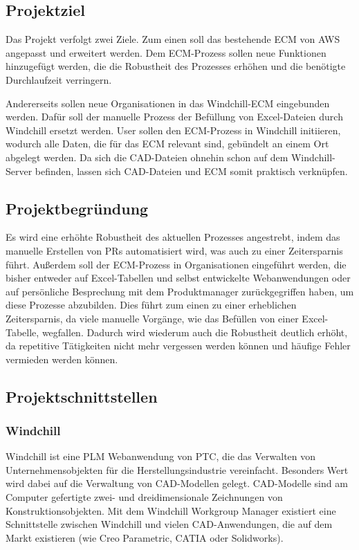 \subsection{Projektziel} 
\label{sec:Projektziel}
Das Projekt verfolgt zwei Ziele.
Zum einen soll das bestehende \ac{ECM} von \ac{AWS} angepasst und erweitert werden.
Dem \ac{ECM}-Prozess sollen neue Funktionen hinzugefügt werden, die die Robustheit des Prozesses erhöhen und die benötigte Durchlaufzeit verringern.

Andererseits sollen neue Organisationen in das Windchill-\ac{ECM} eingebunden werden.
Dafür soll der manuelle Prozess der Befüllung von Excel-Dateien durch Windchill ersetzt werden.
User sollen den \ac{ECM}-Prozess in Windchill initiieren, wodurch alle Daten, die für das \ac{ECM} relevant sind, gebündelt an einem Ort abgelegt werden.
Da sich die CAD-Dateien ohnehin schon auf dem Windchill-Server befinden, lassen sich CAD-Dateien und \ac{ECM} somit praktisch verknüpfen.

\subsection{Projektbegründung} 
\label{sec:Projektbegruendung}
Es wird eine erhöhte Robustheit des aktuellen Prozesses angestrebt, indem das manuelle Erstellen von \acp{PR} automatisiert wird, was auch zu einer Zeitersparnis führt.
Außerdem soll der \ac{ECM}-Prozess in Organisationen eingeführt werden, die bisher entweder auf Excel-Tabellen und selbst entwickelte Webanwendungen oder auf persönliche Besprechung mit dem Produktmanager zurückgegriffen haben, um diese Prozesse abzubilden.
Dies führt zum einen zu einer erheblichen Zeitersparnis, da viele manuelle Vorgänge, wie das Befüllen von einer Excel-Tabelle, wegfallen.
Dadurch wird wiederum auch die Robustheit deutlich erhöht, da repetitive Tätigkeiten nicht mehr vergessen werden können und häufige Fehler vermieden werden können.


\subsection{Projektschnittstellen}
\label{sec:Projektschnittstellen}

\subsubsection{Windchill}
Windchill ist eine \ac{PLM} Webanwendung von PTC, die das Verwalten von Unternehmensobjekten für die Herstellungsindustrie vereinfacht.
Besonders Wert wird dabei auf die Verwaltung von CAD-Modellen gelegt.
CAD-Modelle sind am Computer gefertigte zwei- und dreidimensionale Zeichnungen von Konstruktionsobjekten.
Mit dem Windchill Workgroup Manager existiert eine Schnittstelle zwischen Windchill und vielen CAD-Anwendungen, die auf dem Markt existieren (wie \zB Creo Parametric, CATIA oder Solidworks).

